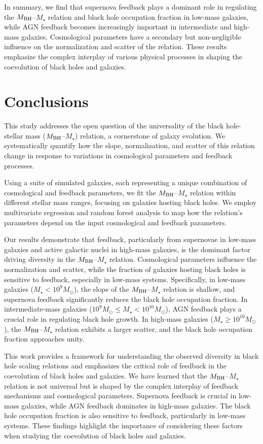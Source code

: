 \documentclass[twocolumn]{aastex631}
\begin{document}
In summary, we find that supernova feedback plays a dominant role in regulating the $M_{\rm BH}$--$M_{\star}$ relation and black hole occupation fraction in low-mass galaxies, while AGN feedback becomes increasingly important in intermediate and high-mass galaxies. Cosmological parameters have a secondary but non-negligible influence on the normalization and scatter of the relation. These results emphasize the complex interplay of various physical processes in shaping the coevolution of black holes and galaxies.

\section{Conclusions}
\label{sec:conclusions}
This study addresses the open question of the universality of the black hole-stellar mass ($M_{\rm BH}$--$M_{\star}$) relation, a cornerstone of galaxy evolution. We systematically quantify how the slope, normalization, and scatter of this relation change in response to variations in cosmological parameters and feedback processes.

Using a suite of simulated galaxies, each representing a unique combination of cosmological and feedback parameters, we fit the $M_{\rm BH}$--$M_{\star}$ relation within different stellar mass ranges, focusing on galaxies hosting black holes. We employ multivariate regression and random forest analysis to map how the relation's parameters depend on the input cosmological and feedback parameters.

Our results demonstrate that feedback, particularly from supernovae in low-mass galaxies and active galactic nuclei in high-mass galaxies, is the dominant factor driving diversity in the $M_{\rm BH}$--$M_{\star}$ relation. Cosmological parameters influence the normalization and scatter, while the fraction of galaxies hosting black holes is sensitive to feedback, especially in low-mass systems. Specifically, in low-mass galaxies ($M_{\star} < 10^9 M_{\odot}$), the slope of the $M_{\rm BH}$--$M_{\star}$ relation is shallow, and supernova feedback significantly reduces the black hole occupation fraction. In intermediate-mass galaxies ($10^9 M_{\odot} \leq M_{\star} < 10^{10} M_{\odot}$), AGN feedback plays a crucial role in regulating black hole growth. In high-mass galaxies ($M_{\star} \geq 10^{10} M_{\odot}$), the $M_{\rm BH}$--$M_{\star}$ relation exhibits a larger scatter, and the black hole occupation fraction approaches unity.

This work provides a framework for understanding the observed diversity in black hole scaling relations and emphasizes the critical role of feedback in the coevolution of black holes and galaxies. We have learned that the $M_{\rm BH}$--$M_{\star}$ relation is not universal but is shaped by the complex interplay of feedback mechanisms and cosmological parameters. Supernova feedback is crucial in low-mass galaxies, while AGN feedback dominates in high-mass galaxies. The black hole occupation fraction is also sensitive to feedback, particularly in low-mass systems. These findings highlight the importance of considering these factors when studying the coevolution of black holes and galaxies.

{}

\end{document}
